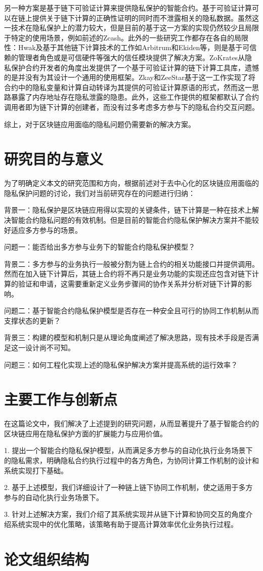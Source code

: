 另一种方案是基于链下可验证计算来提供隐私保护的智能合约。基于可验证计算可以在链上提供关于链下计算的正确性证明的同时而不泄露相关的隐私数据。虽然这一技术在隐私保护上的潜力较大，但是目前的基于这一方案的实现仍然较少且局限于特定的使用场景，例如前述的Zcash\cite{Zcash}。此外的一些研究工作都存在各自的局限性：Hwak\cite{7546538}及基于其他链下计算技术的工作如Arbitrum\cite{217511}和Ekiden\cite{2018arXiv180405141C}等，则是基于可信赖的管理者角色或是可信硬件等强大的信任模块提供了解决方案。ZoKrates\cite{8726497}从隐私保护合约开发者的角度出发提供了一个基于可验证计算的链下计算工具库，遗憾的是并没有为其设计一个通用的使用框架。Zkay\cite{2020arXiv200901020B}和ZeeStar\cite{9833732}基于这一工作实现了将合约中的隐私变量和计算自动转译为其提供的可验证计算原语的形式，然而这一思路暴露了内存地址存在隐私泄露的隐患\cite{10.1145/3548606.3560622}。此外，这些工作提供的框架都默认了合约调用者即为链下计算的创建者，而没有过多考虑多方参与下的隐私合约交互问题。

综上，对于区块链应用面临的隐私问题仍需要新的解决方案。
\section{研究目的与意义}

为了明确定义本文的研究范围和方向，根据前述对于去中心化的区块链应用面临的隐私保护问题的讨论，我们对当前研究存在的问题进行归纳：

背景一：隐私保护是区块链应用得以实现的关键条件，链下计算是一种在技术上解决智能合约隐私问题的有效机制。但是目前的智能合约隐私保护解决方案并不能较好适应多方参与的场景。

问题一：能否给出多方参与业务下的智能合约隐私保护模型？

背景二：多方参与的业务执行一般被分割为链上合约的相关功能接口并提供调用。然而在加入链下计算后，其链上合约将不再只是业务功能的实现还应包含对链下计算的验证和申请，这需要重新定义业务步骤间的协作关系并分析对链下计算的影响。

问题二：基于智能合约隐私保护模型是否存在一种安全且可行的协同工作机制从而支撑状态的更新？

背景三：构建的模型和机制只是从理论角度阐述了解决思路，现有技术手段是否满足这一设计尚不可知。

问题三：如何工程化实现上述的隐私保护解决方案并提高系统的运行效率？

\section{主要工作与创新点}

在这篇论文中，我们解决了上述提到的研究问题，从而显著提升了基于智能合约的区块链应用在隐私保护方面的扩展能力与应用价值。

1. 提出一个智能合约隐私保护模型，从而满足多方参与的自动化执行业务场景下的隐私需求，明确隐私合约执行过程中的各方角色，为协同计算工作机制的设计和系统实现打下基础。

2. 基于上述模型，我们详细设计了一种链上链下协同工作机制，使之适用于多方参与的自动化执行业务场景下。

3. 针对上述解决方案，我们介绍了其系统实现并从链下计算和协同交互的角度介绍系统实现中的优化策略，该策略有助于提高计算效率优化业务执行过程。

\section{论文组织结构}

